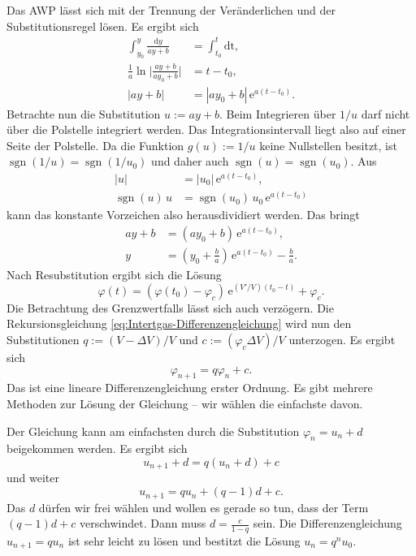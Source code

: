 \documentclass[a4paper,10pt,fleqn,twocolumn,twoside]{scrartcl}
\numberwithin{equation}{section}
\newcommand{\ee}{\mathrm e}
\newcommand{\sgn}{\operatorname{sgn}}
\begin{document}
Das AWP lässt sich mit der Trennung der Veränderlichen und
der Substitutionsregel lösen. Es ergibt sich%
\begin{align}
\int_{y_0}^y \frac{\mathrm dy}{ay+b} &= \int_{t_0}^t\mathrm{dt},\\
\frac{1}{a}\ln\Big|\frac{ay+b}{ay_0+b}\Big| &= t-t_0,\\
|ay+b| &= |ay_0+b|\,\ee^{a(t-t_0)}.
\end{align}
Betrachte nun die Substitution $u:=ay+b$. Beim Integrieren über
$1/u$ darf nicht über die Polstelle integriert werden. Das
Integrationsintervall liegt also auf einer Seite der Polstelle.
Da die Funktion $g(u):=1/u$ keine Nullstellen besitzt, ist
$\sgn(1/u)=\sgn(1/u_0)$ und daher auch $\sgn(u)=\sgn(u_0)$. Aus
\begin{align}
|u| &= |u_0|\,\ee^{a(t-t_0)},\\
\sgn(u)\,u &= \sgn(u_0)\,u_0\,\ee^{a(t-t_0)}
\end{align}
kann das konstante Vorzeichen also herausdividiert werden.
Das bringt
\begin{align}
ay+b &= (ay_0+b)\,\ee^{a(t-t_0)},\\
y &= (y_0+\tfrac{b}{a})\,\ee^{a(t-t_0)}-\tfrac{b}{a}.
\end{align}
Nach Resubstitution ergibt sich die Lösung
\begin{equation}\label{eq:Volumenanteil-Dgl-Loesung}
\varphi(t) = (\varphi(t_0)-\varphi_c)\,\ee^{(V'/V)(t_0-t)}+\varphi_c.
\end{equation}
Die Betrachtung des Grenzwertfalls lässt sich auch verzögern.
Die Rekursionsgleichung \eqref{eq:Intertgas-Differenzengleichung}
wird nun den Substitutionen $q:=(V-\Delta V)/V$ und
$c:=(\varphi_c\Delta V)/V$ unterzogen. Es ergibt sich
\begin{equation}
\varphi_{n+1} = q\varphi_n+c.
\end{equation}
Das ist eine lineare Differenzengleichung erster Ordnung.
Es gibt mehrere Methoden zur Lösung der Gleichung -- wir wählen
die einfachste davon.

Der Gleichung kann am einfachsten durch die Substitution
$\varphi_n=u_n+d$ beigekommen werden. Es ergibt sich%
\begin{equation}
u_{n+1}+d = q(u_n+d)+c
\end{equation}
und weiter
\begin{equation}
u_{n+1} = qu_n+(q-1)d+c.
\end{equation}
Das $d$ dürfen wir frei wählen und wollen es gerade so tun,
dass der Term $(q-1)d+c$ verschwindet. Dann muss $d=\frac{c}{1-q}$
sein. Die Differenzengleichung $u_{n+1}=qu_n$ ist sehr leicht
zu lösen und bestitzt die Lösung $u_n = q^n u_0$.
\end{document}
